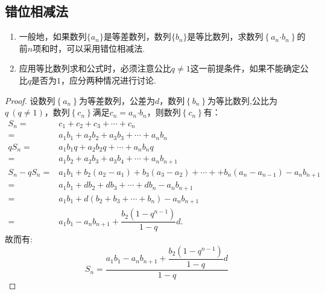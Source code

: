 \documentclass{BHCexam}
\begin{document}
\subsection{错位相减法}
\begin{enumerate}
\item 一般地，如果数列$\{a_n\}$是等差数列，数列$\{b_n\}$是等比数列，求数列$ \left\{a_n\bm{\cdot}b_n\right\} $的前$ n $项和时，可以采用错位相减法.
\item 应用等比数列求和公式时，必须注意公比$ q\ne1 $这一前提条件，如果不能确定公比$ q $是否为$ 1 $，应分两种情况进行讨论.
\end{enumerate}
\begin{proof}
设数列$ \left\{a_n\right\} $为等差数列，公差为$ d $，数列$ \left\{b_n\right\} $为等比数列,公比为$ q ~(q\ne1)$，数列$ \left\{c_n\right\}$满足$ c_n=a_n\bm{\cdot}b_n  $，则数列$ \left\{c_n\right\} $有：\begin{equation*}
\begin{aligned}
S_n=&c_1+c_2+c_3+\cdots+c_n\\
=&a_1b_1+a_2b_2+a_3b_3+\cdots+a_nb_n\\
qS_n=&a_1b_1q+a_2b_2q+\cdots+a_nb_nq\\
=&a_1b_2+a_2b_3+a_3b_4+\cdots+a_nb_{n+1}\\
S_n-qS_n=&a_1b_1+b_2\left(a_2-a_1\right)+b_3\left(a_3-a_2\right)+\cdots++b_n\left(a_n-a_{n-1}\right)-a_nb_{n+1}\\
=&a_1b_1+db_2+db_3+\cdots+db_n-a_nb_{n+1}\\
=&a_1b_1+d\left(b_2+b_3+\cdots+b_n\right)-a_nb_{n+1}\\
=&a_1b_1-a_nb_{n+1}+\dfrac{b_2\left(1-q^{n-1}\right)}{1-q}d.
\end{aligned}
\end{equation*}
故而有:$$S_n=\dfrac{a_1b_1-a_nb_{n+1}+\dfrac{b_2\left(1-q^{n-1}\right)}{1-q}d}{1-q}$$
\end{proof}
\newpage 
\end{document}
